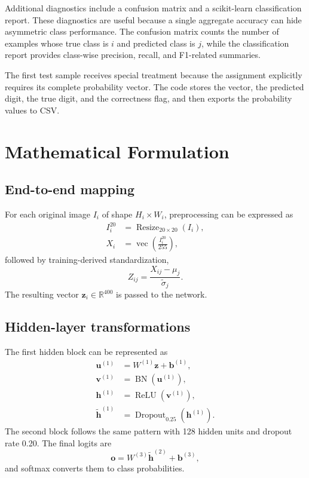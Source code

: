 \documentclass[11pt,a4paper]{article}
\newcommand{\R}{\mathbb{R}}
\begin{document}
Additional diagnostics include a confusion matrix and a scikit-learn classification report. These diagnostics are useful because a single aggregate accuracy can hide asymmetric class performance. The confusion matrix counts the number of examples whose true class is $i$ and predicted class is $j$, while the classification report provides class-wise precision, recall, and F1-related summaries.

The first test sample receives special treatment because the assignment explicitly requires its complete probability vector. The code stores the vector, the predicted digit, the true digit, and the correctness flag, and then exports the probability values to CSV.

\section{Mathematical Formulation}
\subsection{End-to-end mapping}
For each original image $I_i$ of shape $H_i\times W_i$, preprocessing can be expressed as
\begin{align}
I_i^{20} &= \operatorname{Resize}_{20\times20}(I_i),\\
X_i &= \operatorname{vec}\left(\frac{I_i^{20}}{255}\right),
\end{align}
followed by training-derived standardization,
\begin{equation}
Z_{ij}=\frac{X_{ij}-\mu_j}{\tilde{\sigma}_j}.
\end{equation}
The resulting vector $\mathbf{z}_i\in\R^{400}$ is passed to the network.

\subsection{Hidden-layer transformations}
The first hidden block can be represented as
\begin{align}
\mathbf{u}^{(1)} &= W^{(1)}\mathbf{z}+\mathbf{b}^{(1)},\\
\mathbf{v}^{(1)} &= \operatorname{BN}(\mathbf{u}^{(1)}),\\
\mathbf{h}^{(1)} &= \operatorname{ReLU}(\mathbf{v}^{(1)}),\\
\tilde{\mathbf{h}}^{(1)} &= \operatorname{Dropout}_{0.25}(\mathbf{h}^{(1)}).
\end{align}
The second block follows the same pattern with 128 hidden units and dropout rate 0.20. The final logits are
\begin{equation}
\mathbf{o}=W^{(3)}\tilde{\mathbf{h}}^{(2)}+\mathbf{b}^{(3)},
\end{equation}
and softmax converts them to class probabilities.
\end{document}
